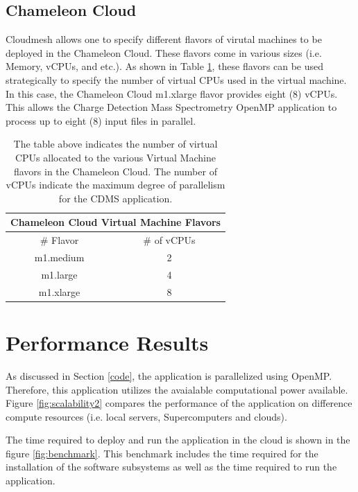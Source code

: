 \documentclass[9pt,twocolumn,twoside]{../../styles/osajnl}
\begin{document}
\subsection{Chameleon Cloud}
Cloudmesh allows one to specify different flavors of virutal machines
to be deployed in the Chameleon Cloud. These flavors come in various
sizes (i.e. Memory, vCPUs, and etc.). As shown in Table
\ref{tab:hadoop}, these flavors can be used strategically to specify
the number of virtual CPUs used in the virtual machine. In this case,
the Chameleon Cloud m1.xlarge flavor provides eight (8) vCPUs. This
allows the Charge Detection Mass Spectrometry OpenMP application to
process up to eight (8) input files in parallel.
\begin{table}[htbp]
\centering
\begin{tabular}{cc}
\multicolumn{2}{c}{\bf Chameleon Cloud Virtual Machine Flavors}\\
\hline
\# Flavor & \# of vCPUs \\
\hline
m1.medium & 2 \\
m1.large & 4 \\
m1.xlarge & 8 \\
\hline
\end{tabular}
\caption{The table above indicates the number of virtual CPUs
  allocated to the various Virtual Machine flavors in the Chameleon
  Cloud. The number of vCPUs indicate the maximum degree of
  parallelism for the CDMS application.}
\label{tab:hadoop}
\end{table}

\section{Performance Results} \label{benchmark-sect}
As discussed in Section \ref{code}, the application is parallelized
using OpenMP. Therefore, this application utilizes the avaialable
computational power available. Figure \ref{fig:scalability2} compares
the performance of the application on difference compute resources
(i.e. local servers, Supercomputers and clouds).

The time required to deploy and run the application in the cloud is
shown in the figure \ref{fig:benchmark}. This benchmark includes the
time required for the installation of the software subsystems as well
as the time required to run the application.
\end{document}
